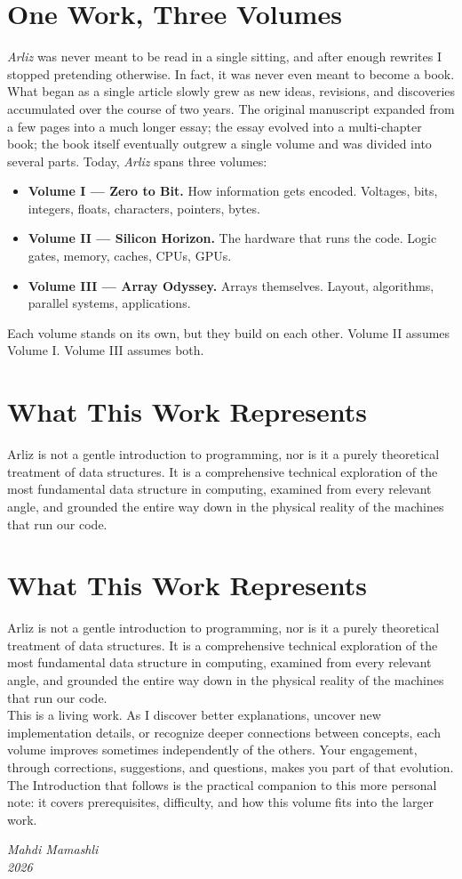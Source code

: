 \vfill
{\small \linespread{1.2}\selectfont
\section*{One Work, Three Volumes}
\textit{Arliz} was never meant to be read in a single sitting, and after enough rewrites I stopped pretending otherwise. In fact, it was never even meant to become a book.\\
What began as a single article slowly grew as new ideas, revisions, and discoveries accumulated over the course of two years. The original manuscript expanded from a few pages into a much longer essay; the essay evolved into a multi-chapter book; the book itself eventually outgrew a single volume and was divided into several parts. Today, \textit{Arliz} spans three volumes:

\begin{itemize}
    \item \textbf{Volume I --- Zero to Bit.} How information gets encoded. Voltages, bits, integers, floats, characters, pointers, bytes.
    \item \textbf{Volume II --- Silicon Horizon.} The hardware that runs the code. Logic gates, memory, caches, CPUs, GPUs.
    \item \textbf{Volume III --- Array Odyssey.} Arrays themselves. Layout, algorithms, parallel systems, applications.
\end{itemize}
Each volume stands on its own, but they build on each other. Volume II assumes Volume I. Volume III assumes both.

\section*{What This Work Represents}
Arliz is not a gentle introduction to programming, nor is it a purely theoretical treatment of data structures. It is a comprehensive technical exploration of the most fundamental data structure in computing, examined from every relevant angle, and grounded the entire way down in the physical reality of the machines that run our code.

\section*{What This Work Represents}
Arliz is not a gentle introduction to programming, nor is it a purely theoretical treatment of data structures. It is a comprehensive technical exploration of the most fundamental data structure in computing, examined from every relevant angle, and grounded the entire way down in the physical reality of the machines that run our code.\\
This is a living work. As I discover better explanations, uncover new implementation details, or recognize deeper connections between concepts, each volume improves sometimes independently of the others. Your engagement, through corrections, suggestions, and questions, makes you part of that evolution. The Introduction that follows is the practical companion to this more personal note: it covers prerequisites, difficulty, and how this volume fits into the larger work.

\vfill

\begin{flushright}
    \textit{Mahdi Mamashli} \\
    \textit{2026}
\end{flushright}
}
\clearpage